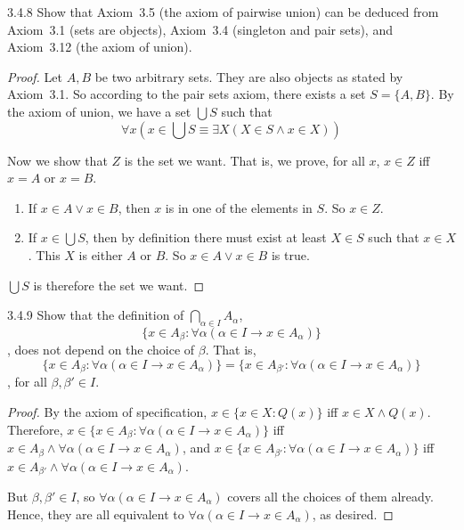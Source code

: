 \begin{exercise}{3.4.8}
	Show that Axiom~3.5 (the axiom of pairwise union) can be deduced from Axiom~3.1 (sets are objects), Axiom~3.4 (singleton and pair sets), and Axiom~3.12 (the axiom of union).
\end{exercise}
\begin{proof}
	Let $A,B$ be two arbitrary sets. They are also objects as stated by Axiom~3.1. So according to the pair sets axiom, there exists a set $S=\{A,B\}$. By the axiom of union, we have a set $\bigcup S$ such that 
	\[
	\forall x(x \in \bigcup S \equiv \exists X(X \in S \wedge x \in X))
	\]
	
	Now we show that $Z$ is the set we want. That is, we prove, for all $x$, $x \in Z$ iff $x = A$ or $x = B$.
	\begin{enumerate}
		\item  If $x \in A \vee x \in B$, then $x$ is in one of the elements in $S$. So $x \in Z$.
		
		\item If $x \in \bigcup S$, then by definition there must exist at least $X \in S$ such that $x \in X$. This $X$ is either $A$ or $B$. So $x \in A \vee x \in B$ is true.
	\end{enumerate}
	
	$\bigcup S$ is therefore the set we want. 
\end{proof}

\begin{exercise}{3.4.9}
	Show that the definition of $\bigcap_{\alpha \in I} A_\alpha$, 
	\[
		\{x \in A_\beta : \forall \alpha(\alpha \in I \to x \in A_\alpha)\}
	\]
	, does not depend on the choice of $\beta$. That is,
	\[
		\{x \in A_\beta : \forall \alpha(\alpha \in I \to x \in A_\alpha)\} =
		\{x \in A_{\beta'} : \forall \alpha(\alpha \in I \to x \in A_\alpha)\}
	\]
	, for all $\beta,\beta' \in I$.
\end{exercise}
\begin{proof}
	By the axiom of specification, $x \in \{x \in X : Q(x)\}$ iff $x \in X \wedge Q(x)$. Therefore,
	$x \in \{x \in A_\beta : \forall \alpha(\alpha \in I \to x \in A_\alpha)\}$ iff $x \in A_\beta \wedge \forall \alpha(\alpha \in I \to x \in A_\alpha)$, and $x \in \{x \in A_{\beta'} : \forall \alpha(\alpha \in I \to x \in A_\alpha)\}$ iff $x \in A_{\beta'} \wedge \forall \alpha(\alpha \in I \to x \in A_\alpha)$.
	
	But $\beta, \beta' \in I$, so $\forall \alpha(\alpha \in I \to x \in A_\alpha)$ covers all the choices of them already. Hence, they are all equivalent to $\forall \alpha(\alpha \in I \to x \in A_\alpha)$, as desired.
\end{proof}

